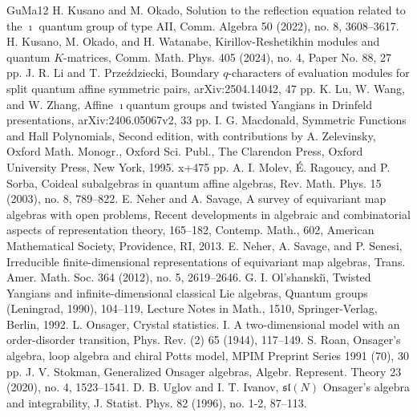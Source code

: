 \documentclass[12pt,a4paper]{amsart}
\theoremstyle{definition}
\numberwithin{equation}{subsection}
\begin{document}
\begin{thebibliography}{GuMa12}
   H. Kusano and M. Okado, Solution to the reflection equation related to the $\imath$ quantum group of type AII, Comm. Algebra 50 (2022), no. 8, 3608--3617.
   H. Kusano, M. Okado, and H. Watanabe, Kirillov-Reshetikhin modules and quantum $K$-matrices, Comm. Math. Phys. 405 (2024), no. 4, Paper No. 88, 27 pp.
   J. R. Li and T. Prze\'{z}dziecki, Boundary $q$-characters of evaluation modules for split quantum affine symmetric pairs, arXiv:2504.14042, 47 pp.
   K. Lu, W. Wang, and W. Zhang, Affine $\imath$quantum groups and twisted Yangians in Drinfeld presentations, arXiv:2406.05067v2, 33 pp.
   I. G. Macdonald, Symmetric Functions and Hall Polynomials, Second edition, with contributions by A. Zelevinsky, Oxford Math. Monogr., Oxford Sci. Publ., The Clarendon Press, Oxford University Press, New York, 1995. x+475 pp.
   A. I. Molev, É. Ragoucy, and P. Sorba, Coideal subalgebras in quantum affine algebras, Rev. Math. Phys. 15 (2003), no. 8, 789--822.
   E. Neher and A. Savage, A survey of equivariant map algebras with open problems, Recent developments in algebraic and combinatorial aspects of representation theory, 165--182, Contemp. Math., 602, American Mathematical Society, Providence, RI, 2013.
   E. Neher, A. Savage, and P. Senesi, Irreducible finite-dimensional representations of equivariant map algebras, Trans. Amer. Math. Soc. 364 (2012), no. 5, 2619--2646.
   G. I. Ol'shanski\u{\i}, Twisted Yangians and infinite-dimensional classical Lie algebras, Quantum groups (Leningrad, 1990), 104--119, Lecture Notes in Math., 1510, Springer-Verlag, Berlin, 1992.
   L. Onsager, Crystal statistics. I. A two-dimensional model with an order-disorder transition, Phys. Rev. (2) 65 (1944), 117--149.
   S. Roan, Onsager's algebra, loop algebra and chiral Potts model, MPIM Preprint Series 1991 (70), 30 pp.
   J. V. Stokman, Generalized Onsager algebras, Algebr. Represent. Theory 23 (2020), no. 4, 1523--1541.
   D. B. Uglov and I. T. Ivanov, $\mathfrak{sl}(N)$  Onsager's algebra and integrability, J. Statist. Phys. 82 (1996), no. 1-2, 87--113.
\end{thebibliography}
\end{document}
